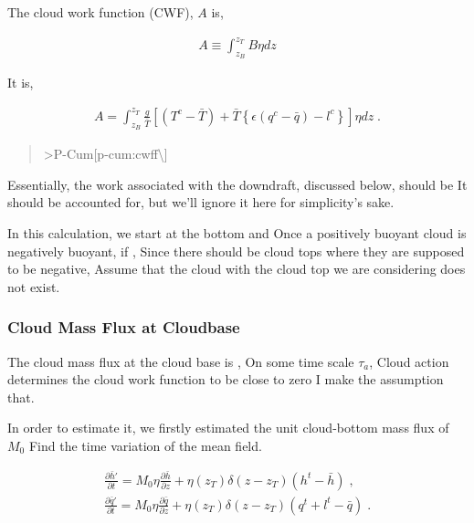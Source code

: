 The cloud work function (CWF), \(A\) is,

\begin{eqnarray}
  A \equiv \int_{z_B}^{z_T} B \eta dz 
\end{eqnarray}

It is,

\begin{eqnarray}
A = \int_{z_B}^{z_T} \frac{g}{\bar{T}} \left[
        (T^c-\bar{T})
      + \bar{T} \left\{ \epsilon (q^c - \bar{q} ) 
                     - l^c                 \right\}
       \right] \eta dz \; .
\end{eqnarray}

\begin{quote}
\protect\hypertarget{p-cum:cwf}{}{
\textgreater P-Cum{[}p-cum:cwff\textbackslash{]}}
\end{quote}

Essentially, the work associated with the downdraft, discussed below,
should be It should be accounted for, but we'll ignore it here for
simplicity's sake.

In this calculation, we start at the bottom and Once a positively
buoyant cloud is negatively buoyant, if , Since there should be cloud
tops where they are supposed to be negative, Assume that the cloud with
the cloud top we are considering does not exist.

\hypertarget{cloud-mass-flux-at-cloudbase}{%
\subsubsection{Cloud Mass Flux at
Cloudbase}\label{cloud-mass-flux-at-cloudbase}}

The cloud mass flux at the cloud base is , On some time scale
\(\tau_a\), Cloud action determines the cloud work function to be close
to zero I make the assumption that.

In order to estimate it, we firstly estimated the unit cloud-bottom mass
flux of \(M_0\) Find the time variation of the mean field.

\begin{eqnarray}
  \frac{\partial \bar{h}'}{\partial t}  =  M_0 \eta \frac{\partial \bar{h}}{\partial z} 
                       + \eta(z_T) \delta(z-z_T) ( h^t - \bar{h} ) \; , \\
  \frac{\partial \bar{q}'}{\partial t}  =  M_0 \eta \frac{\partial \bar{q}}{\partial z} 
                       + \eta(z_T) \delta(z-z_T) ( q^t + l^t - \bar{q} ) \; .
\end{eqnarray}

